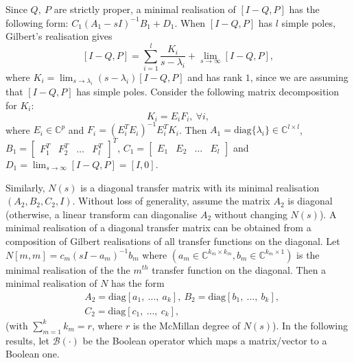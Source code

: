 \documentclass[twocolumn,12pt]{autart}
\theoremstyle{plain}
\begin{document}
Since $Q,~P$ are strictly proper, a minimal realisation of $[I-{Q},{P}]$ has the following form: ${C}_1({A}_1-sI)^{-1}{B}_1+D_1$. When $[I-Q,P]$ has $l$ simple poles, Gilbert's realisation \cite{gilbert} gives
\begin{equation}\label{eq:gilbertqp}
[I-{Q},{P}]=\sum_{i=1}^l
\frac{{K}_i}{s-\lambda_i}+\lim_{s\rightarrow\infty}[I-{Q},{P}],
\end{equation}
where ${K}_i =
\lim_{s\rightarrow\lambda_i}(s-\lambda_i)[I-{Q},{P}]$ and has
rank $1$, since we are assuming that $[I-{Q},{P}]$ has simple poles. Consider the following matrix decomposition for ${K}_i$:
\begin{equation}\label{eq:E}
{K}_i={E}_i{F}_i,~\forall i,
\end{equation}
where ${E}_i \in \mathbb{C}^{p}$ and
${F}_i=({E}_i^T{E}_i)^{-1}{E}_i^T{K}_i$. Then ${A}_1=\text{diag}\{\lambda_i\}\in\mathbb{C}^{l\times l}$, ${B}_1=\begin{bmatrix} {F}^T_1 & {F}^T_2 & \ldots &
  {F}^T_l \end{bmatrix}^T$, ${C}_1=\begin{bmatrix}
  {E}_1 & {E}_2 & \ldots & {E}_l \end{bmatrix}$ and
${D}_1=\lim_{s\rightarrow\infty}[I-{Q},{P}]=[I,0]$.

Similarly, $N(s)$ is a diagonal transfer matrix with its minimal realisation $(A_2,B_2,C_2,I)$. Without loss of generality, assume the matrix ${A}_2$ is diagonal  (otherwise, a linear transform can diagonalise $A_2$ without changing $N(s)$). A minimal realisation of a diagonal transfer matrix can be obtained from a composition of Gilbert realisations of all transfer functions on the diagonal. Let $N[m,m]=c_m(sI-a_m)^{-1}b_m$ where $(a_m\in\mathbb{C}^{k_m\times k_m}, b_m \in \mathbb{C}^{k_m\times 1})$ is the minimal realisation of the the $m^{th}$ transfer function on the diagonal. Then a minimal realisation of $N$ has the form
\begin{align}
&A_2=\text{diag} [a_1,~\ldots,~a_k], ~B_2=\text{diag} [b_1,~\ldots,~b_k],\nonumber\\
&C_2=\text{diag} [c_1,~\ldots,~c_k],\label{eq:realisationofN}
\end{align}
 (with $\sum_{m=1}^k k_m=r$, where $r$ is the McMillan degree of $N(s)$). In the following results, let $\mathcal{B}(\cdot)$ be the Boolean operator which maps a matrix/vector to a Boolean one.
\end{document}
